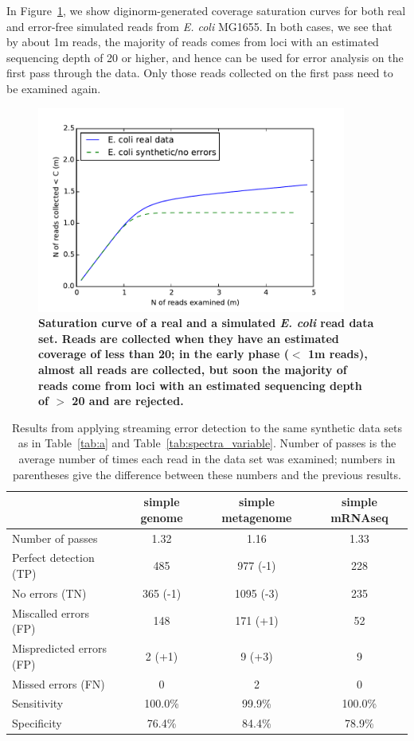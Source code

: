 \documentclass{article}
\begin{document}
In Figure~\ref{fig:saturation}, we show diginorm-generated coverage
saturation curves for both real and error-free simulated reads from
{\em E. coli} MG1655.  In both cases, we see that by about 1m reads,
the majority of reads comes from loci with an estimated sequencing
depth of 20 or higher, and hence can be used for error analysis on the
first pass through the data.  Only those reads collected on the first
pass need to be examined again.

\begin{figure}[!ht]
 \centerline{\includegraphics[width=4in]{./figures/saturation}}
\caption{\bf Saturation curve of a real and a simulated {\em E. coli} read data
set.  Reads are collected when they have an estimated coverage of less
than 20; in the early phase ($<$ 1m reads), almost all reads are
collected, but soon the majority of reads come from loci with an estimated
sequencing depth of $>$ 20 and are rejected.}
\label{fig:saturation}
\end{figure}


\begin{table}
\begin{tabular}{|l|c||c||c|}
\hline
& simple genome & simple metagenome & simple mRNAseq \\
\hline
Number of passes & 1.32 & 1.16 & 1.33 \\
\hline
Perfect detection (TP) & 485 & 977 (-1) & 228 \\
No errors (TN) & 365 (-1) & 1095 (-3) & 235 \\
Miscalled errors (FP) & 148 & 171 (+1) & 52 \\
Mispredicted errors (FP) & 2 (+1) & 9 (+3) & 9 \\
Missed errors (FN) & 0 & 2 & 0 \\
\hline
Sensitivity & 100.0\% & 99.9\% & 100.0\% \\
Specificity & 76.4\% & 84.4\% & 78.9\% \\
\hline
\end{tabular}
\label{tab:spectra_streaming}

\caption{Results from applying streaming error detection to the same
  synthetic data sets as in Table~\ref{tab:a} and
  Table~\ref{tab:spectra_variable}.  Number of passes is the average
  number of times each read in the data set was examined; numbers in
  parentheses give the difference between these numbers and the
  previous results.}
\end{table}
\end{document}
